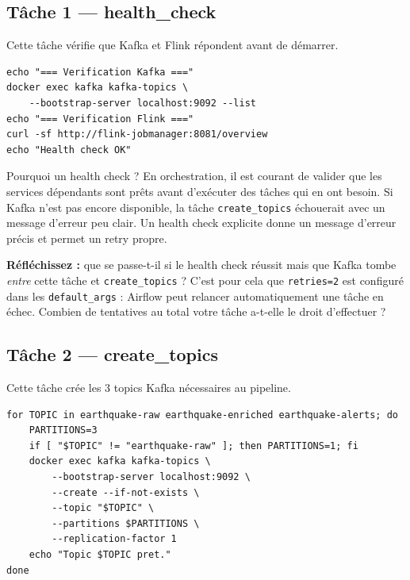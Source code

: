 \documentclass[12pt,a4paper]{article}
\begin{document}
\subsection{Tâche 1 --- health\_check}

Cette tâche vérifie que Kafka et Flink répondent avant de démarrer.

\begin{lstlisting}[style=bash, caption={Commande bash pour health\_check}]
echo "=== Verification Kafka ==="
docker exec kafka kafka-topics \
    --bootstrap-server localhost:9092 --list
echo "=== Verification Flink ==="
curl -sf http://flink-jobmanager:8081/overview
echo "Health check OK"
\end{lstlisting}

\begin{conceptbox}{Pourquoi un health check ?}
  En orchestration, il est courant de valider que les services dépendants sont prêts
  avant d'exécuter des tâches qui en ont besoin. Si Kafka n'est pas encore disponible,
  la tâche \texttt{create\_topics} échouerait avec un message d'erreur peu clair.
  Un health check explicite donne un message d'erreur précis et permet un retry propre.
\end{conceptbox}

\begin{warningbox}
  \textbf{Réfléchissez :} que se passe-t-il si le health check réussit mais que Kafka
  tombe \emph{entre} cette tâche et \texttt{create\_topics} ?
  C'est pour cela que \texttt{retries=2} est configuré dans les \texttt{default\_args} :
  Airflow peut relancer automatiquement une tâche en échec.
  Combien de tentatives au total votre tâche a-t-elle le droit d'effectuer ?
\end{warningbox}

\subsection{Tâche 2 --- create\_topics}

Cette tâche crée les 3 topics Kafka nécessaires au pipeline.

\begin{lstlisting}[style=bash, caption={Création idempotente des topics}]
for TOPIC in earthquake-raw earthquake-enriched earthquake-alerts; do
    PARTITIONS=3
    if [ "$TOPIC" != "earthquake-raw" ]; then PARTITIONS=1; fi
    docker exec kafka kafka-topics \
        --bootstrap-server localhost:9092 \
        --create --if-not-exists \
        --topic "$TOPIC" \
        --partitions $PARTITIONS \
        --replication-factor 1
    echo "Topic $TOPIC pret."
done
\end{lstlisting}
\end{document}
